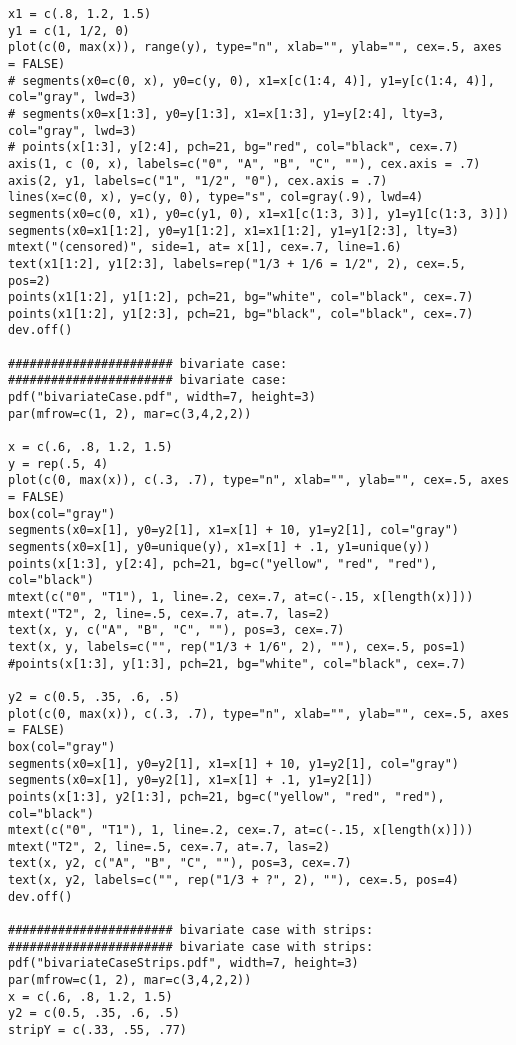 \documentclass[]{article}
\begin{document}
{{\begin{verbatim}
x1 = c(.8, 1.2, 1.5)
y1 = c(1, 1/2, 0)
plot(c(0, max(x)), range(y), type="n", xlab="", ylab="", cex=.5, axes = FALSE)
# segments(x0=c(0, x), y0=c(y, 0), x1=x[c(1:4, 4)], y1=y[c(1:4, 4)], col="gray", lwd=3)
# segments(x0=x[1:3], y0=y[1:3], x1=x[1:3], y1=y[2:4], lty=3, col="gray", lwd=3)
# points(x[1:3], y[2:4], pch=21, bg="red", col="black", cex=.7)
axis(1, c (0, x), labels=c("0", "A", "B", "C", ""), cex.axis = .7)
axis(2, y1, labels=c("1", "1/2", "0"), cex.axis = .7)
lines(x=c(0, x), y=c(y, 0), type="s", col=gray(.9), lwd=4)
segments(x0=c(0, x1), y0=c(y1, 0), x1=x1[c(1:3, 3)], y1=y1[c(1:3, 3)])
segments(x0=x1[1:2], y0=y1[1:2], x1=x1[1:2], y1=y1[2:3], lty=3)
mtext("(censored)", side=1, at= x[1], cex=.7, line=1.6)
text(x1[1:2], y1[2:3], labels=rep("1/3 + 1/6 = 1/2", 2), cex=.5, pos=2)
points(x1[1:2], y1[1:2], pch=21, bg="white", col="black", cex=.7)
points(x1[1:2], y1[2:3], pch=21, bg="black", col="black", cex=.7)
dev.off()

####################### bivariate case:
####################### bivariate case:
pdf("bivariateCase.pdf", width=7, height=3)
par(mfrow=c(1, 2), mar=c(3,4,2,2))

x = c(.6, .8, 1.2, 1.5)
y = rep(.5, 4)
plot(c(0, max(x)), c(.3, .7), type="n", xlab="", ylab="", cex=.5, axes = FALSE)
box(col="gray")
segments(x0=x[1], y0=y2[1], x1=x[1] + 10, y1=y2[1], col="gray")
segments(x0=x[1], y0=unique(y), x1=x[1] + .1, y1=unique(y))
points(x[1:3], y[2:4], pch=21, bg=c("yellow", "red", "red"), col="black")
mtext(c("0", "T1"), 1, line=.2, cex=.7, at=c(-.15, x[length(x)]))
mtext("T2", 2, line=.5, cex=.7, at=.7, las=2)
text(x, y, c("A", "B", "C", ""), pos=3, cex=.7)
text(x, y, labels=c("", rep("1/3 + 1/6", 2), ""), cex=.5, pos=1)
#points(x[1:3], y[1:3], pch=21, bg="white", col="black", cex=.7)

y2 = c(0.5, .35, .6, .5)
plot(c(0, max(x)), c(.3, .7), type="n", xlab="", ylab="", cex=.5, axes = FALSE)
box(col="gray")
segments(x0=x[1], y0=y2[1], x1=x[1] + 10, y1=y2[1], col="gray")
segments(x0=x[1], y0=y2[1], x1=x[1] + .1, y1=y2[1])
points(x[1:3], y2[1:3], pch=21, bg=c("yellow", "red", "red"), col="black")
mtext(c("0", "T1"), 1, line=.2, cex=.7, at=c(-.15, x[length(x)]))
mtext("T2", 2, line=.5, cex=.7, at=.7, las=2)
text(x, y2, c("A", "B", "C", ""), pos=3, cex=.7)
text(x, y2, labels=c("", rep("1/3 + ?", 2), ""), cex=.5, pos=4)
dev.off()

####################### bivariate case with strips:
####################### bivariate case with strips:
pdf("bivariateCaseStrips.pdf", width=7, height=3)
par(mfrow=c(1, 2), mar=c(3,4,2,2))
x = c(.6, .8, 1.2, 1.5)
y2 = c(0.5, .35, .6, .5)
stripY = c(.33, .55, .77)


\end{verbatim}}}
\end{document}
